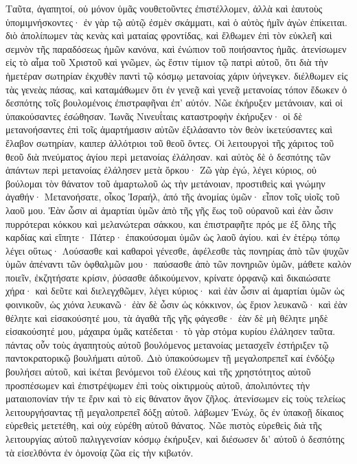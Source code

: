 Ταῦτα, ἀγαπητοί, οὐ μόνον ὑμᾶς νουθετοῦντες ἐπιστέλλομεν, ἀλλὰ καὶ ἑαυτοὺς ὑπομιμνήσκοντες· ἐν γὰρ τῷ αὐτῷ ἐσμὲν σκάμματι, καὶ ὁ αὐτὸς ἡμῖν ἀγὼν ἐπίκειται. διὸ ἀπολίπωμεν τὰς κενὰς καὶ ματαίας φροντίδας, καὶ ἔλθωμεν ἐπὶ τὸν εὐκλεῆ καὶ σεμνὸν τῆς παραδόσεως ἡμῶν κανόνα, καὶ ἐνώπιον τοῦ ποιήσαντος ἡμᾶς. ἀτενίσωμεν εἰς τὸ αἷμα τοῦ Χριστοῦ καὶ γνῶμεν, ὡς ἔστιν τίμιον τῷ πατρὶ αὐτοῦ, ὅτι διὰ τὴν ἡμετέραν σωτηρίαν ἐκχυθὲν παντὶ τῷ κόσμῳ μετανοίας χάριν ὑήνεγκεν. διέλθωμεν εἰς τὰς γενεὰς πάσας, καὶ καταμάθωμεν ὅτι ἐν γενεᾷ καὶ γενεᾷ μετανοίας τόπον ἔδωκεν ὁ δεσπότης τοῖς βουλομένοις ἐπιστραφῆναι ἐπ’ αὐτόν. Νῶε ἐκήρυξεν μετάνοιαν, καὶ οἱ ὑπακούσαντες ἐσώθησαν. Ἰωνᾶς Νινευΐταις καταστροφὴν ἐκήρυξεν· οἱ δὲ μετανοήσαντες ἐπὶ τοῖς ἁμαρτήμασιν αὐτῶν ἐξιλάσαντο τὸν θεὸν ἱκετεύσαντες καὶ ἔλαβον σωτηρίαν, καιπερ ἀλλότριοι τοῦ θεοῦ ὄντες.
Οἱ λειτουργοὶ τῆς χάριτος τοῦ θεοῦ διὰ πνεύματος ἁγίου περὶ μετανοίας ἐλάλησαν. καὶ αὐτὸς δὲ ὁ δεσπότης τῶν ἁπάντων περὶ μετανοίας ἐλάλησεν μετὰ ὅρκου· Ζῶ γὰρ ἐγώ, λέγει κύριος, οὐ βούλομαι τὸν θάνατον τοῦ ἁμαρτωλοῦ ὡς τὴν μετάνοιαν, προστιθεὶς καὶ γνώμην ἀγαθήν· Μετανοήσατε, οἶκος Ἰσραήλ, ἀπό τῆς ἀνομίας ὑμῶν· εἶπον τοῖς υἱοῖς τοῦ λαοῦ μου. Ἐὰν ὦσιν αἱ ἁμαρτίαι ὑμῶν ἀπὸ τῆς γῆς ἕως τοῦ οὐρανοῦ καὶ ἐὰν ὦσιν πυρρότεραι κόκκου καὶ μελανώτεραι σάκκου, και ἐπιστραφῆτε πρός με ἐξ ὅλης τῆς καρδίας καὶ εἴπητε· Πάτερ· ἐπακούσομαι ὑμῶν ὡς λαοῦ ἁγίου. καὶ ἐν ἑτέρῳ τόπῳ λέγει οὕτως· Λούσασθε καὶ καθαροὶ γένεσθε, ἀφέλεσθε τὰς πονηρίας ἀπὸ τῶν ψυχῶν ὑμῶν ἀπέναντι τῶν ὀφθαλμῶν μου· παύσασθε ἀπὸ τῶν πονηριῶν ὑμῶν, μάθετε καλὸν ποιεῖν, ἐκζητήσατε κρίσιν, ῥύσασθε ἀδικούμενον, κρίνατε ὀρφανῷ καὶ δικαιώσατε χήρα· καὶ δεῦτε καὶ διελεγχθῶμεν, λέγει κύριος· καὶ ἐὰν ὦσιν αἱ ἁμαρτίαι ὑμῶν ὡς φοινικοῦν, ὡς χιόνα λευκανῶ· ἐὰν δὲ ὦσιν ὡς κόκκινον, ὡς ἔριον λευκανῶ· καὶ ἐὰν θέλητε καὶ εἰσακούσητέ μου, τὰ ἀγαθὰ τῆς γῆς φάγεσθε· ἐὰν δὲ μὴ θέλητε μηδὲ εἰσακούσητέ μου, μάχαιρα ὑμᾶς κατέδεται· τὸ γὰρ στόμα κυρίου ἐλάλησεν ταῦτα. πάντας οὖν τοὺς ἀγαπητοὺς αὐτοῦ βουλόμενος μετανοίας μετασχεῖν ἐστήριξεν τῷ παντοκρατορικῷ βουλήματι αὐτοῦ.
Διὸ ὐπακούσωμεν τῇ μεγαλοπρεπεῖ καί ἐνδόξῳ βουλήσει αὐτοῦ, καὶ ἱκέται βενόμενοι τοῦ ἐλέους καὶ τῆς χρηστότητος αὐτοῦ προσπέσωμεν καὶ ἐπιστρέψωμεν ἐπὶ τοὺς οἰκτιρμοὺς αὐτοῦ, ἀπολιπόντες τὴν ματαιοπονίαν τήν τε ἔριν καὶ τὸ εἰς θάνατον ἄγον ζῆλος. ἀτενίσωμεν εἰς τοὺς τελείως λειτουργήσαντας τῇ μεγαλοπρεπεῖ δόξῃ αὐτοῦ. λάβωμεν Ἐνώχ, ὃς ἐν ὑπακοῇ δίκαιος εὑρεθεὶς μετετέθη, καὶ οὐχ εὑρέθη αὐτοῦ θάνατος. Νῶε πιστὸς εὑρεθεὶς διὰ τῆς λειτουργίας αὐτοῦ παλιγγενσίαν κόσμῳ ἐκήρυξεν, καὶ διέσωσεν δι’ αὐτοῦ ὁ δεσπότης τὰ εἰσελθόντα ἐν ὁμονοίᾳ ζῶα εἰς τὴν κιβωτόν. 
